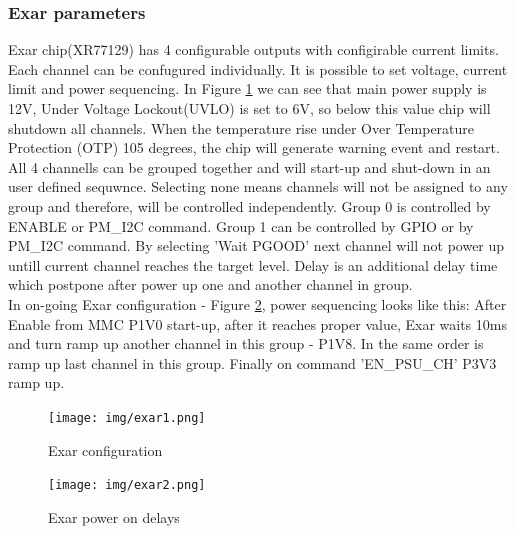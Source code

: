 \subsubsection{Exar parameters}

Exar chip(XR77129) has 4 configurable outputs with configirable current limits. Each channel can be confugured individually. It is possible to set voltage, current limit and power sequencing. In Figure \ref{exar1} we can see that main power supply is 12V, Under Voltage Lockout(UVLO) is set to 6V, so below this value chip will shutdown all channels. When the temperature rise under Over Temperature Protection (OTP) 105 degrees, the chip will generate warning event and restart. \\
All 4 channells can be grouped together and will start-up and shut-down in an user defined sequwnce. Selecting none means channels will not be assigned to any group and therefore, will be controlled independently. Group 0 is controlled by ENABLE or PM\_I2C command. Group 1 can be controlled by GPIO or by PM\_I2C command. By selecting 'Wait PGOOD' next channel will not power up untill current channel reaches the target level. Delay is an additional delay time which postpone after power up one and another channel in group.\\
In on-going Exar configuration - Figure \ref{exar2}, power sequencing looks like this: After Enable from MMC P1V0 start-up, after it reaches proper value, Exar waits 10ms and turn ramp up another channel in this group - P1V8. In the same order is ramp up last channel in this group. Finally on command 'EN\_PSU\_CH' P3V3 ramp up.



	\begin{figure}[htbp!]
		\centering
		\texttt{[image: img/exar1.png]}\\
		\caption{Exar configuration} \label{exar1}
	\end{figure}
	
	\begin{figure}[htbp!]
		\centering
		\texttt{[image: img/exar2.png]}\\
		\caption{Exar power on delays} \label{exar2}
	\end{figure}	
	
\clearpage	


